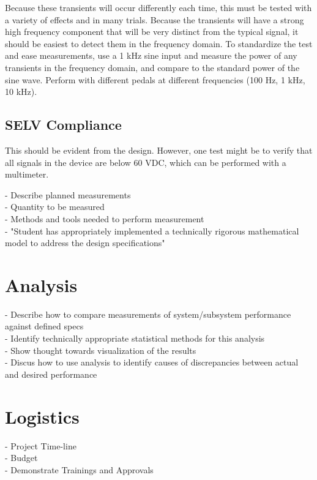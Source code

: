 \documentclass{article}
\begin{document}
	Because these transients will occur differently each time, this must be tested with a variety of effects and in many trials.  Because the transients will have a strong high frequency component that will be very distinct from the typical signal, it should be easiest to detect them in the frequency domain.  To standardize the test and ease measurements, use a 1 kHz sine input and measure the power of any transients in the frequency domain, and compare to the standard power of the sine wave.  Perform with different pedals at different frequencies (100 Hz, 1 kHz, 10 kHz).

	\subsection{SELV Compliance}
	This should be evident from the design.  However, one test might be to verify that all signals in the device are below 60 VDC, which can be performed with a multimeter.

	
	- Describe planned measurements \\
		- Quantity to be measured \\
		- Methods and tools needed to perform measurement \\
	- "Student has appropriately implemented a technically rigorous mathematical model to address the design specifications"
\section{Analysis}
	- Describe how to compare measurements of system/subsystem performance against defined specs \\
	- Identify technically appropriate statistical methods for this analysis \\
	- Show thought towards visualization of the results \\
	- Discus how to use analysis to identify causes of discrepancies between actual and desired performance
\section{Logistics}
	- Project Time-line \\
	- Budget \\
	- Demonstrate Trainings and Approvals

\newpage
% 
% 
\end{document}
